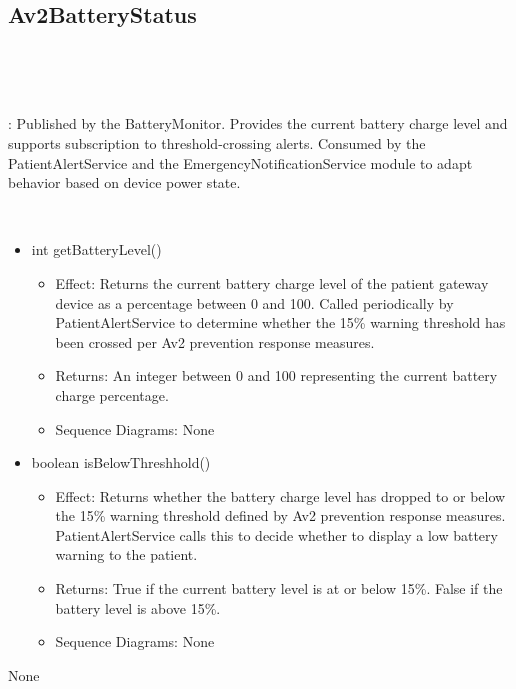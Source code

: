   \subsection{Av2BatteryStatus}\label{int:InterfacesAv2BatteryStatus}
    \begin{description}
      \item[Provided by:] \iconcomponent{}~
      \item[Required by:] \iconcomponent{}~ 
           \item[Description]: Published by the BatteryMonitor. Provides the current battery charge level and supports subscription to threshold-crossing alerts. Consumed by the PatientAlertService and the EmergencyNotificationService module to adapt behavior based on device power state.
      \item[Operations:] ~
    \begin{itemize}[noitemsep,nolistsep,leftmargin=-.25cm]
      \item \textsf{int getBatteryLevel()}
        \begin{itemize}[noitemsep,nolistsep]
           \item Effect: Returns the current battery charge level of the patient gateway device as a percentage between 0 and 100. Called periodically by PatientAlertService to determine whether the 15\% warning threshold has been crossed per Av2 prevention response measures. 
           \item Returns: An integer between 0 and 100 representing the current battery charge percentage.
           \item Sequence Diagrams: None
        \end{itemize}
      \item \textsf{boolean isBelowThreshhold()}
        \begin{itemize}[noitemsep,nolistsep]
           \item Effect: Returns whether the battery charge level has dropped to or below the 15\% warning threshold defined by Av2 prevention response measures. PatientAlertService calls this to decide whether to display a low battery warning to the patient. 
           \item Returns: True if the current battery level is at or below 15\%. False if the battery level is above 15\%.
           \item Sequence Diagrams: None
        \end{itemize}
    \end{itemize}
      \item[Diagrams:] None
    \end{description}

